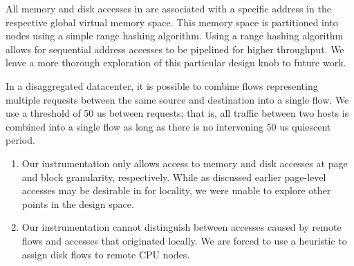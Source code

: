All memory and disk accesses in \dis are associated with a specific address in the respective global virtual memory space. This memory space is partitioned into nodes using a simple range hashing algorithm. Using a range hashing algorithm allows for sequential address accesses to be pipelined for higher throughput. We leave a more thorough exploration of this particular design knob to future work.

In a disaggregated datacenter, it is possible to combine flows representing multiple requests between the same source and destination into a single flow. We use a threshold of 50 us between requests; that is, all traffic between two hosts is combined into a single flow as long as there is no intervening 50 us quiescent period. 



\begin{enumerate}
\item Our instrumentation only allows access to memory and disk accesses at page and block granularity, respectively. While as discussed earlier page-level accesses may be desirable in \dis for locality, we were unable to explore other points in the design space.
\item Our instrumentation cannot distinguish between accesses caused by remote flows and accesses that originated locally. We are forced to use a heuristic to assign disk flows to remote CPU nodes.
\end{enumerate}


